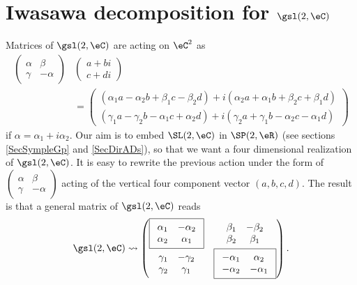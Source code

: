 \section{Iwasawa decomposition for \texorpdfstring{$\gsl(2,\eC)$}{sl2C}}		\label{SecIwasldeuxC}

Matrices of $\gsl(2,\eC)$ are acting on $\eC^2$ as 
\[ 
\begin{split}
  \begin{pmatrix}
\alpha&\beta\\\gamma&-\alpha
\end{pmatrix}&
\begin{pmatrix}
a+bi\\c+di
\end{pmatrix}\\
&=
\begin{pmatrix}
(\alpha_1a-\alpha_2b+\beta_1c-\beta_2d)+i(\alpha_2a+\alpha_1b+\beta_2c+\beta_1d)\\
(\gamma_1a-\gamma_2b-\alpha_1c+\alpha_2d)+i(\gamma_2a+\gamma_1b-\alpha_2c-\alpha_1d)
\end{pmatrix}
\end{split}
\]
if $\alpha=\alpha_1+i\alpha_2$.  Our aim is to embed $\SL(2,\eC)$ in $\SP(2,\eR)$ (see sections \ref{SecSympleGp} and \ref{SecDirADs}), so that we want a four dimensional realization of $\gsl(2,\eC)$. It is easy to rewrite the previous action under the form of $\begin{pmatrix}
\alpha&\beta\\\gamma&-\alpha
\end{pmatrix}$ acting of the vertical four component vector $(a,b,c,d)$. The result is that a general matrix of $\gsl(2,\eC)$ reads
\begin{equation}		\label{EqGenslMatr}
\gsl(2,\eC)\leadsto
\begin{pmatrix}
\boxed{
\begin{array}{cc}
\alpha_1&-\alpha_2\\
\alpha_2&\alpha_1
\end{array}
}&
\begin{array}{cc}
\beta_1&-\beta_2\\
\beta_2&\beta_1
\end{array}\\
\begin{array}{cc}
\gamma_1&-\gamma_2\\
\gamma_2&\gamma_1
\end{array}&
\boxed{
\begin{array}{cc}
-\alpha_1&\alpha_2\\
-\alpha_2&-\alpha_1
\end{array}
}
\end{pmatrix}.
\end{equation}
